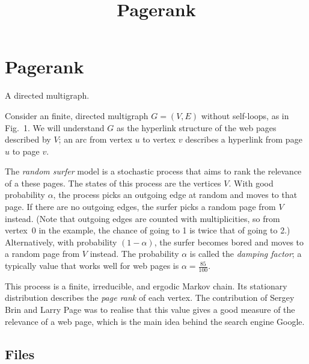 \documentclass{tufte-handout}
\title{\sf Pagerank}
\begin{document}
\maketitle

\section{Pagerank}

\begin{marginfigure}
\caption{A directed multigraph.}
\end{marginfigure}
Consider an finite, directed multigraph $G=(V,E)$ without self-loops, as in
Fig.~1.
We will understand $G$ as the hyperlink structure of the web pages
described by $V$; an arc from vertex $u$ to vertex $v$ describes a
hyperlink from page $u$ to page $v$.

The \emph{random surfer} model is a stochastic process that aims to
rank the relevance of a these pages.
The states of this process are the vertices $V$.
With good probability $\alpha$, the process picks an outgoing edge at
random and moves to that page.
If there are no outgoing edges, the surfer picks a random page from
$V$ instead.
(Note that outgoing edges are counted with multiplicities, so from
vertex~0 in the example, the chance of going to 1 is twice that of
going to 2.)
Alternatively, with probability $(1-\alpha)$, the surfer becomes bored
and moves to a random page from $V$ instead.
The probability $\alpha$ is called the \emph{damping factor}; a
typically value that works well for web pages is $\alpha = \frac{85}{100}$. 

This process is a finite, irreducible, and ergodic Markov chain.
Its stationary distribution describes the \emph{page rank} of each
vertex. The contribution of Sergey Brin and Larry Page was to
realise that this value gives a good measure of the relevance of a web
page, which is the main idea behind the search engine
Google.

\subsection{Files}
\end{document}
